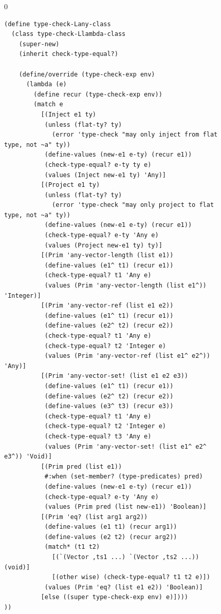 \documentclass[7x10]{TimesAPriori_MIT}%
\def\racketEd{0}
\providecommand{\BookEdition}{1}
\let\edition\BookEdition
\numberwithin{theorem}{chapter}
\numberwithin{definition}{chapter}
\numberwithin{equation}{chapter}
\begin{document}
\begin{figure}[btp]
  \begin{tcolorbox}[colback=white]
    {\if\edition\racketEd
\begin{lstlisting}[basicstyle=\ttfamily\footnotesize]
(define type-check-Lany-class
  (class type-check-Llambda-class
    (super-new)
    (inherit check-type-equal?)

    (define/override (type-check-exp env)
      (lambda (e)
        (define recur (type-check-exp env))
        (match e
          [(Inject e1 ty)
           (unless (flat-ty? ty)
             (error 'type-check "may only inject from flat type, not ~a" ty))
           (define-values (new-e1 e-ty) (recur e1))
           (check-type-equal? e-ty ty e)
           (values (Inject new-e1 ty) 'Any)]
          [(Project e1 ty)
           (unless (flat-ty? ty)
             (error 'type-check "may only project to flat type, not ~a" ty))
           (define-values (new-e1 e-ty) (recur e1))
           (check-type-equal? e-ty 'Any e)
           (values (Project new-e1 ty) ty)]
          [(Prim 'any-vector-length (list e1))
           (define-values (e1^ t1) (recur e1))
           (check-type-equal? t1 'Any e)
           (values (Prim 'any-vector-length (list e1^)) 'Integer)]
          [(Prim 'any-vector-ref (list e1 e2))
           (define-values (e1^ t1) (recur e1))
           (define-values (e2^ t2) (recur e2))
           (check-type-equal? t1 'Any e)
           (check-type-equal? t2 'Integer e)
           (values (Prim 'any-vector-ref (list e1^ e2^)) 'Any)]
          [(Prim 'any-vector-set! (list e1 e2 e3))
           (define-values (e1^ t1) (recur e1))
           (define-values (e2^ t2) (recur e2))
           (define-values (e3^ t3) (recur e3))
           (check-type-equal? t1 'Any e)
           (check-type-equal? t2 'Integer e)
           (check-type-equal? t3 'Any e)
           (values (Prim 'any-vector-set! (list e1^ e2^ e3^)) 'Void)]
          [(Prim pred (list e1))
           #:when (set-member? (type-predicates) pred)
           (define-values (new-e1 e-ty) (recur e1))
           (check-type-equal? e-ty 'Any e)
           (values (Prim pred (list new-e1)) 'Boolean)]
          [(Prim 'eq? (list arg1 arg2))
           (define-values (e1 t1) (recur arg1))
           (define-values (e2 t2) (recur arg2))
           (match* (t1 t2)
             [(`(Vector ,ts1 ...) `(Vector ,ts2 ...))   (void)]
             [(other wise) (check-type-equal? t1 t2 e)])
           (values (Prim 'eq? (list e1 e2)) 'Boolean)]
          [else ((super type-check-exp env) e)])))
))
\end{lstlisting}
}
\end{tcolorbox}
\end{figure}
\end{document}
